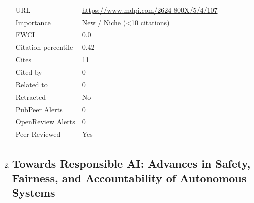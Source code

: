 \documentclass{article}
\begin{document}
\begin{enumerate}[label=\arabic*., font=\Large]
\begin{longtable}{p{} p{\contentcolwidth-2\tabcolsep}}
URL & \url{https://www.mdpi.com/2624-800X/5/4/107} \\
Importance & New / Niche (<10 citations) \\
FWCI & 0.0 \\
Citation percentile & 0.42 \\
Cites & 11 \\
Cited by & 0 \\
Related to & 0 \\
Retracted & No \\
PubPeer Alerts & 0 \\
OpenReview Alerts & 0 \\
Peer Reviewed & Yes \\
\bottomrule
\end{longtable}

\item
{}\label{towards-responsible-ai-advances-in-safety-fairness-and-accountability-of-autonomous-systems}
\hypertarget{item_CANOResponsibleAIAdvancesSafetyFairnessAccountability2025a}{}
\subsection*{Towards Responsible AI: Advances in Safety, Fairness, and Accountability of Autonomous Systems}


\end{enumerate}
\end{document}
